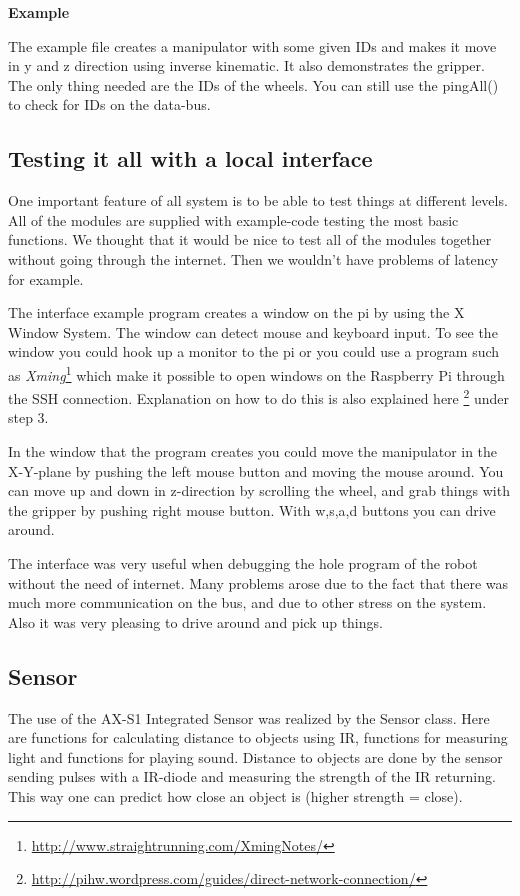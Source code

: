 \bigskip

\textbf{Example}

The example file creates a manipulator with some given IDs and makes it move in y and z direction using inverse kinematic. It also demonstrates the gripper. The only thing needed are the IDs of the wheels. You can still use the pingAll() to check for IDs on the data-bus.

\subsection{Testing it all with a local interface}

One important feature of all system is to be able to test things at different levels. All of the modules are supplied with example-code testing the most basic functions. We thought that it would be nice to test all of the modules together without going through the internet. Then we wouldn't have problems of latency for example. 

The interface example program creates a window on the pi by using the X Window System. The window can detect mouse and keyboard input. To see the window you could hook up a monitor to the pi or you could use a program such as \textit{Xming}\footnote{\url{http://www.straightrunning.com/XmingNotes/}} which make it possible to open windows on the Raspberry Pi through the SSH connection. Explanation on how to do this is also explained here \footnote{\url{http://pihw.wordpress.com/guides/direct-network-connection/}} under step 3.

In the window that the program creates you could move the manipulator in the X-Y-plane by pushing the left mouse button and moving the mouse around. You can move up and down in z-direction by scrolling the wheel, and grab things with the gripper by pushing right mouse button. With w,s,a,d buttons you can drive  around.

The interface was very useful when debugging the hole program of the robot without the need of internet. Many problems arose due to the fact that there was much more communication on the bus, and due to other stress on the system. Also it was very pleasing to drive around and pick up things. 

\subsection{Sensor}

The use of the AX-S1 Integrated Sensor was realized by the Sensor class. Here are functions for calculating distance to objects using IR, functions for measuring light and functions for playing sound. Distance to objects are done by the sensor sending pulses with a IR-diode and measuring the strength of the IR returning. This way one can predict how close an object is (higher strength = close). 

